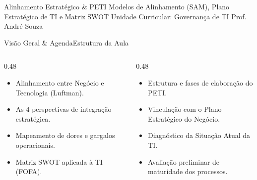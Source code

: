 
\senaicover
  {Alinhamento Estratégico \& PETI}
  {Modelos de Alinhamento (SAM), Plano Estratégico de TI e Matriz SWOT}
  {Unidade Curricular: Governança de TI}
  {Prof. André Souza}

\begin{senaiframe}{Visão Geral \& Agenda}{Estrutura da Aula}
  \begin{columns}[t]
    \begin{column}{0.48\textwidth}
      \begin{tcolorbox}[senaibluecard, title={1. Modelo SAM}]
        \begin{itemize}
          \item Alinhamento entre Negócio e Tecnologia (Luftman).
          \item As 4 perspectivas de integração estratégica.
        \end{itemize}
      \end{tcolorbox}
      \vspace{4pt}
      \begin{tcolorbox}[senaiambercard, title={3. Diagnóstico Situacional}]
        \begin{itemize}
          \item Mapeamento de dores e gargalos operacionais.
          \item Matriz SWOT aplicada à TI (FOFA).
        \end{itemize}
      \end{tcolorbox}
    \end{column}
    \begin{column}{0.48\textwidth}
      \begin{tcolorbox}[senairedcard, title={2. O PETI}]
        \begin{itemize}
          \item Estrutura e fases de elaboração do PETI.
          \item Vinculação com o Plano Estratégico do Negócio.
        \end{itemize}
      \end{tcolorbox}
      \vspace{4pt}
      \begin{tcolorbox}[senaigreencard, title={4. Capítulo 2 do PDGTI}]
        \begin{itemize}
          \item Diagnóstico da Situação Atual da TI.
          \item Avaliação preliminar de maturidade dos processos.
        \end{itemize}
      \end{tcolorbox}
    \end{column}
  \end{columns}
\end{senaiframe}


